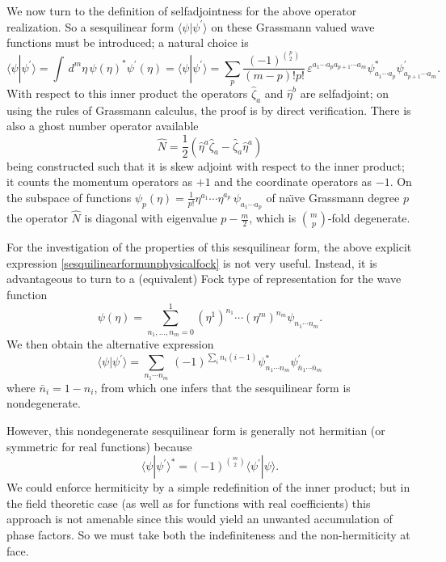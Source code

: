 \documentclass[a4paper,10pt]{article}
\begin{document}
We now turn to the definition of selfadjointness for the above operator realization. So a 
sesquilinear form $\langle\psi|\psi^{\prime}\rangle$ on these Grassmann valued wave 
functions must be introduced; a natural choice is
\begin{equation}\label{sesquilinearformunphysicalfock}
\langle\psi|\psi^{\prime}\rangle=\int\,d^{m}\eta\,\psi(\eta)^{\ast}
\psi^{\prime}(\eta)=\langle\psi|\psi^{\prime}\rangle=\sum_{p}\frac{(-1)^{{p \choose 
2}}}{(m-p)!p!}\,\varepsilon^{a_1\cdots a_pa_{p+1}\cdots a_m}\psi^{\ast}_{a_1\cdots 
a_p}\psi^{\prime}_{a_{p+1}\cdots a_m}.
\end{equation}
With respect to this inner product the operators $\hat{\zeta}_a$ and $\hat{\eta}^b$ are 
selfadjoint; on using the rules of Grassmann 
calculus, the proof is by direct verification. There is also a ghost number operator 
\cite{Kugo 79} available
\begin{equation}
\hat{N}=\frac{1}{2}\left(\hat{\eta}^a\hat{\zeta}_a-\hat{\zeta}_a\hat{\eta}^a\right)
\end{equation}
being constructed such that it is skew adjoint with respect to the inner product; it  
counts the momentum operators as $+1$ and the coordinate operators as $-1$.
On the subspace of functions  
$\psi_p(\eta)=\frac{1}{p!}\eta^{a_1}\cdots\eta^{a_p}\,\psi_{a_1\cdots a_p}$ of na\"\i ve 
Grassmann degree $p$ the operator $\hat{N}$ is diagonal with eigenvalue $p-\frac{m}{2}$, 
which is ${m \choose p}$-fold degenerate.

For the investigation of the properties of this sesquilinear form, the above explicit 
expression \eqref{sesquilinearformunphysicalfock} is not very useful. Instead, it is 
advantageous to turn to a (equivalent) Fock type of representation for the wave function
\begin{equation}\label{schroedingerwavefunctionrealfermionsfock}
\psi(\eta)=\sum_{n_1,\ldots,n_m=0}^{1}(\eta^1)^{n_1}\cdots
(\eta^m)^{n_m}\psi_{n_1\cdots n_m}.
\end{equation}
We then obtain the alternative expression
\begin{equation}\label{innerproductfockrepresentationunphysical}
\langle\psi|\psi^{\prime}\rangle=\sum_{n_1\cdots n_m}\,(-1)^{\sum_{i}n_i(i-1)}
\psi_{n_1\cdots n_m}^{\ast}\psi^{\prime}_{\bar{n}_1\cdots\bar{n}_m}
\end{equation}
where $\bar{n}_i=1-n_i $, from which one infers that the sesquilinear form is 
nondegenerate.

However, this nondegenerate sesquilinear form is generally not hermitian (or symmetric 
for real functions) because
\begin{equation}
\langle\psi|\psi^{\prime}\rangle^{\ast}=(-1)^{{m \choose 2}}
\langle\psi^{\prime}|\psi\rangle.
\end{equation}
We could enforce hermiticity by a simple redefinition of the inner product; but in the 
field theoretic case (as well as for functions with real coefficients) this approach is 
not amenable since this would yield an unwanted accumulation of phase factors. So we must 
take both the indefiniteness and the non-hermiticity at face.
\end{document}
